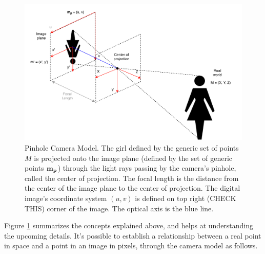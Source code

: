 \begin{figure}[ht]
	\centering
	\includegraphics[width=\textwidth]{images/cameraconcepts.pdf}
	\caption[Pinhole Camera Model]{Pinhole Camera Model. The girl defined by the generic set of points $M$ is projected onto the image plane (defined by the set of generic points $\bf m_{p}$) through the light rays passing by the camera's pinhole, called the center of projection. The focal length is the distance from the center of the image plane to the center of projection. The digital image's coordinate system $(u, v)$ is defined on top right (CHECK THIS) corner of the image. The optical axis is the blue line.}
	\label{cha2:sec2:fig:camera_concepts}
\end{figure}

Figure \ref{cha2:sec2:fig:camera_concepts} summarizes the concepts explained above, and helps at understanding the upcoming details. It's possible to establish a relationship between a real point in space and a point in an image in pixels, through the camera model as follows.

